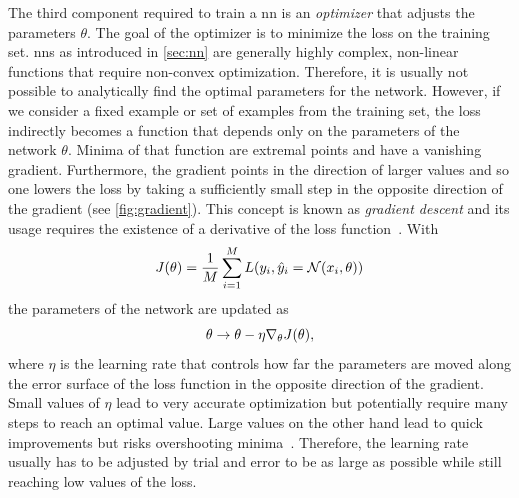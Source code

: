 The third component required to train a \acrshort{nn} is an \emph{optimizer} that adjusts the parameters $\theta$. The goal of the optimizer is to minimize the loss on the training set. \acrshort{nn}s as introduced in \autoref{sec:nn} are generally highly complex, non-linear functions that require non-convex optimization. Therefore, it is usually not possible to analytically find the optimal parameters for the network. However, if we consider a fixed example or set of examples from the training set, the loss indirectly becomes a function that depends only on the parameters of the network $\theta$. Minima of that function are extremal points and have a vanishing gradient. Furthermore, the gradient points in the direction of larger values and so one lowers the loss by taking a sufficiently small step in the opposite direction of the gradient (see \autoref{fig:gradient}). This concept is known as \emph{gradient descent} and its usage requires the existence of a derivative of the loss function~\cite{Goodfellow:2016:DNN}. %
With
\begin{equation}\label{eq:total-loss}
J{\left( \theta \right)}=\frac{1}{M}\sum_{i=1}^M L{\left( y_i, \hat{y}_i=\mathcal{N}{\left( x_i, \theta \right)} \right)}
\end{equation}
the parameters of the network are updated as~\cite{Goodfellow:2016:DNN}%
\begin{equation}\label{eq:gradient-update}
\theta\to\theta-\eta\nabla_\theta J{\left( \theta \right)},
\end{equation}
where $\eta$ is the learning rate that controls how far the parameters are moved along the error surface of the loss function in the opposite direction of the gradient. Small values of $\eta$ lead to very accurate optimization but potentially require many steps to reach an optimal value. Large values on the other hand lead to quick improvements but risks overshooting minima~\cite{Goodfellow:2016:DNN}. %
Therefore, the learning rate usually has to be adjusted by trial and error to be as large as possible while still reaching low values of the loss.

